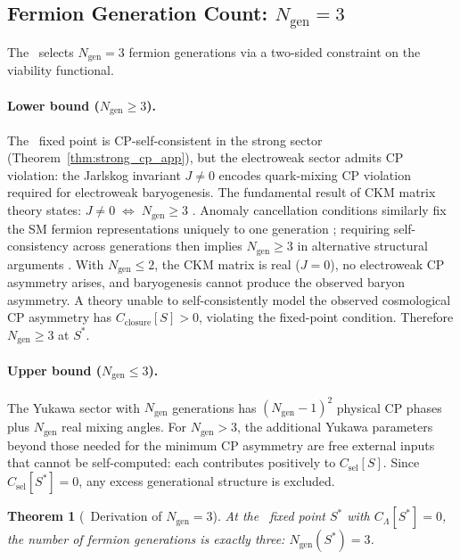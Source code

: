 \documentclass[11pt]{article}
\newtheorem{theorem}{Theorem}[section]
\theoremstyle{remark}
\newcommand{\SRRG}{\text{SRRG}}
\newcommand{\Sstar}{S^*}
\begin{document}
\begin{appendices}
\subsection{Fermion Generation Count: $N_{\mathrm{gen}} = 3$}
\label{app:ngen}

The \SRRG\ selects $N_{\mathrm{gen}} = 3$ fermion generations via a two-sided
constraint on the viability functional.

\paragraph{Lower bound ($N_{\mathrm{gen}} \geq 3$).}
The \SRRG\ fixed point is CP-self-consistent in the strong sector
(Theorem~\ref{thm:strong_cp_app}), but the electroweak sector admits CP violation:
the Jarlskog invariant $J \neq 0$ encodes quark-mixing CP violation required for
electroweak baryogenesis.  The fundamental result of CKM matrix theory states:
$J \neq 0 \;\Leftrightarrow\; N_{\mathrm{gen}} \geq 3$ \cite{Jarlskog1985}.
Anomaly cancellation conditions similarly fix the SM fermion
representations uniquely to one generation \cite{GengMarshak1989};
requiring self-consistency across generations then implies $N_{\mathrm{gen}} \geq 3$
in alternative structural arguments \cite{DobrescuPoppitz2001,Frampton1992}.
With $N_{\mathrm{gen}} \leq 2$, the CKM matrix is real ($J = 0$), no electroweak
CP asymmetry arises, and baryogenesis cannot produce the observed baryon asymmetry.
A theory unable to self-consistently model the observed cosmological CP asymmetry
has $C_{\mathrm{closure}}[S] > 0$, violating the fixed-point condition.
Therefore $N_{\mathrm{gen}} \geq 3$ at $\Sstar$.

\paragraph{Upper bound ($N_{\mathrm{gen}} \leq 3$).}
The Yukawa sector with $N_{\mathrm{gen}}$ generations has $(N_{\mathrm{gen}}-1)^2$
physical CP phases plus $N_{\mathrm{gen}}$ real mixing angles.  For
$N_{\mathrm{gen}} > 3$, the additional Yukawa parameters beyond those needed for
the minimum CP asymmetry are free external inputs that cannot be self-computed:
each contributes positively to $C_{\mathrm{sel}}[S]$.  Since $C_{\mathrm{sel}}[\Sstar] = 0$,
any excess generational structure is excluded.

\begin{theorem}[\SRRG\ Derivation of $N_{\mathrm{gen}} = 3$]
\label{thm:ngen_app}
At the \SRRG\ fixed point $\Sstar$ with $C_\Lambda[\Sstar] = 0$, the number of
fermion generations is exactly three: $N_{\mathrm{gen}}(\Sstar) = 3$.
\end{theorem}


\end{appendices}
\end{document}
